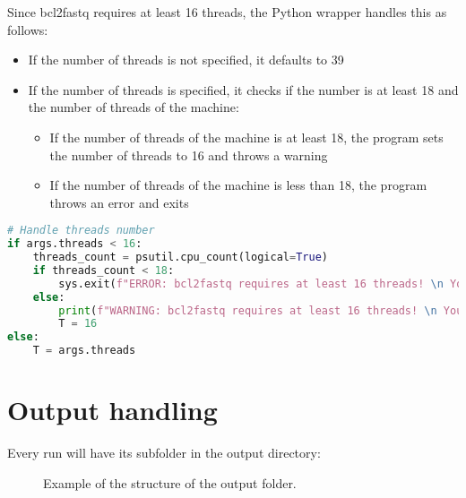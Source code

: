 Since bcl2fastq requires at least 16 threads, the Python wrapper handles this as follows:
\begin{itemize}
    \item If the number of threads is not specified, it defaults to 39
    \item If the number of threads is specified, it checks if the number is at least 18 and the number of threads of the machine:
    \begin{itemize}
        \item If the number of threads of the machine is at least 18, the program sets the number of threads to 16 and throws a warning
        \item If the number of threads of the machine is less than 18, the program throws an error and exits
    \end{itemize}
\end{itemize}

\begin{lstlisting}[breaklines=true, language=python, caption=Code section you will need to change if you want to modify how you handle multithreading.]
# Handle threads number
if args.threads < 16:
    threads_count = psutil.cpu_count(logical=True)
    if threads_count < 18:
        sys.exit(f"ERROR: bcl2fastq requires at least 16 threads! \n You only have {threads_count} threads!")
    else:
        print(f"WARNING: bcl2fastq requires at least 16 threads! \n You have {threads_count} threads, number of threads is now set to 16.")
        T = 16
else:
    T = args.threads
\end{lstlisting}

\section{Output handling}
Every run will have its subfolder in the output directory:

\begin{figure}[H]
    \centering    
    \caption{Example of the structure of the output folder.}
    \label{fig:outputfolder}
\end{figure}


